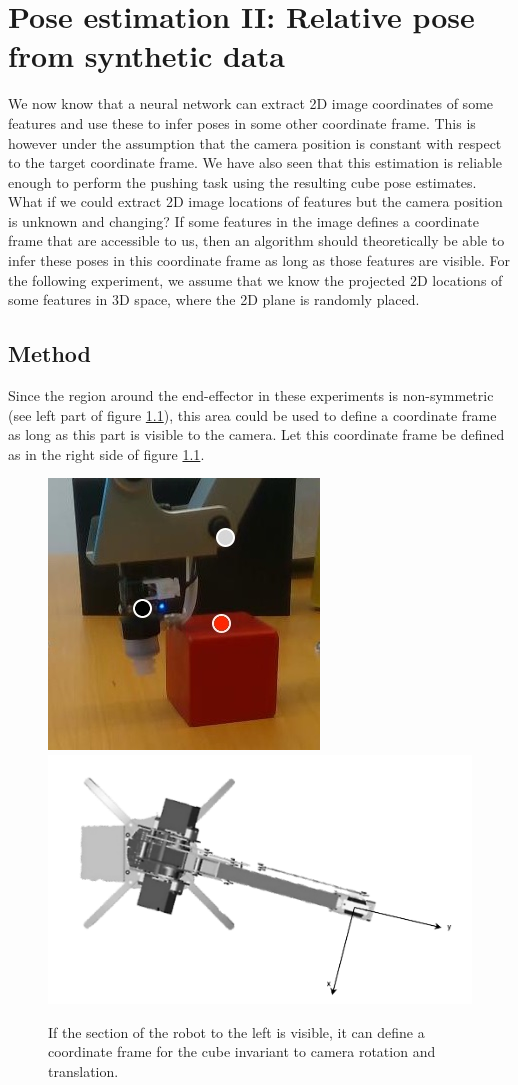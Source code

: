 \chapter{Pose estimation II: Relative pose from synthetic data}

We now know that a neural network can extract 2D image coordinates of some
features and use these to infer poses in some other coordinate frame.  This is
however under the assumption that the camera position is constant with respect
to the target coordinate frame. We have also seen that this estimation is
reliable enough to perform the pushing task using the resulting cube pose
estimates. What if we could extract 2D image locations of features but the
camera position is unknown and changing? If some features in the image defines
a coordinate frame that are accessible to us, then an algorithm should
theoretically be able to infer these poses in this coordinate frame as long as
those features are visible. For the following experiment, we assume that we
know the projected 2D locations of some features in 3D space, where the 2D plane
is randomly placed.

\section{Method}
\label{subsec:sim_moving}

Since the region around the end-effector in these experiments is non-symmetric
(see left part of figure \ref{fig:end-effector-frame}), this area could be used
to define a coordinate frame as long as this part is visible to the camera. Let
this coordinate frame be defined as in the right side of figure
\ref{fig:end-effector-frame}.

\begin{figure}[h!]
    \centering
    \includegraphics[width=0.32 \textwidth]{res/pose-feature-points.jpg}
    \includegraphics[width=0.5 \textwidth]{res/end-effector-frame.pdf}

    \caption{If the section of the robot to the left is visible, it can define
    a coordinate frame for the cube invariant to camera rotation and
    translation.}

    \label{fig:end-effector-frame}
    
\end{figure}

